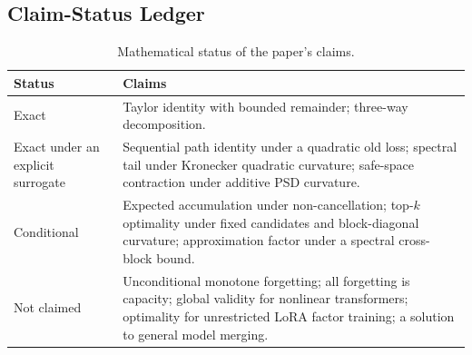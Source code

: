 \subsection{Claim-Status Ledger}

\begin{table}[h]
\caption{Mathematical status of the paper's claims.}
\label{tab:claim-status}
\centering
\small
\begin{tabularx}{\linewidth}{lX}
\toprule
Status & Claims \\
\midrule
Exact & Taylor identity with bounded remainder; three-way decomposition. \\
Exact under an explicit surrogate & Sequential path identity under a
quadratic old loss; spectral tail under Kronecker quadratic curvature;
safe-space contraction under additive PSD curvature. \\
Conditional & Expected accumulation under non-cancellation; top-$k$ optimality
under fixed candidates and block-diagonal curvature; approximation factor under
a spectral cross-block bound. \\
Not claimed & Unconditional monotone forgetting; all forgetting is capacity;
global validity for nonlinear transformers; optimality for unrestricted LoRA
factor training; a solution to general model merging. \\
\bottomrule
\end{tabularx}
\end{table}
